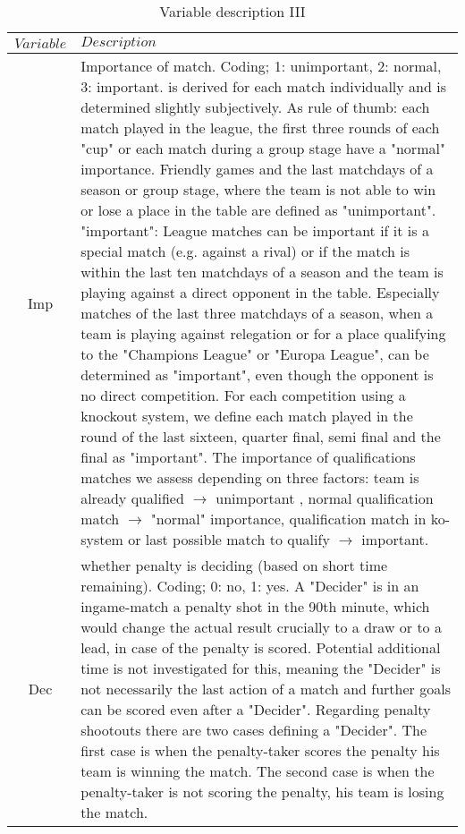 \documentclass[12pt,dvipsnames]{article}%
\begin{document}
\begin{table}[h]
\caption{Variable description \small{III}}
\centering
\begin{tabular}{ c | p{12cm}  }
    $Variable$ & $Description$   \\
   \hline

Imp & Importance of match. Coding; 1: unimportant, 2: normal, 3: important.  is derived for each match individually and is determined slightly subjectively. As rule of thumb: each match played in the league, the first three rounds of each "cup" or each match during a group stage have a "normal" importance. Friendly games and the last matchdays of a season or group stage, where the team is not able to win or lose a place in the table are defined as "unimportant". \linebreak "important":  League matches can be important if it is a special match (e.g. against a rival) or if the match is within the last ten matchdays of a season and the team is playing against a direct opponent in the table. Especially matches of the last three matchdays of a season, when a team is playing against relegation or for a place qualifying to the "Champions League" or "Europa League", can be determined as "important", even though the opponent is no direct competition.  For each competition using a knockout system, we define each match played in the round of the last sixteen, quarter final, semi final and the final as "important". The importance of qualifications matches we assess depending on three factors: team is already qualified $\rightarrow$ unimportant , normal qualification match $\rightarrow$ "normal" importance, qualification match in ko-system or last possible match to qualify $\rightarrow$ important.  \\

Dec & whether penalty is deciding (based on short time remaining). Coding; 0: no, 1: yes. A "Decider" is in an ingame-match a penalty shot in the 90th minute, which would change the actual result crucially to a draw or to a lead, in case of the penalty is scored. Potential additional time is not investigated for this, meaning the "Decider" is not necessarily the last action of a match and further goals can be scored even after a "Decider". Regarding penalty shootouts there are two cases defining a "Decider". The first case is when the penalty-taker scores the penalty his team is winning the match. The second case is when the penalty-taker is not scoring the penalty, his team is losing the match. \\



\end{tabular}
\end{table}
\end{document}
